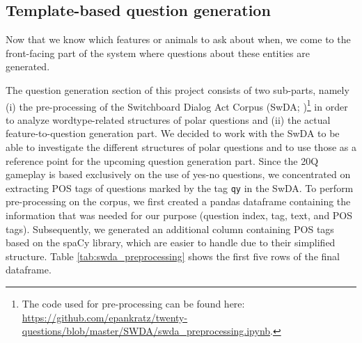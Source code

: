 \documentclass[11pt,a4paper]{article}
\begin{document}
{%
\subsection{Template-based question generation}
\label{subsec:qg}

Now that we know which features or animals to ask about when, we come to the front-facing part of the system where questions about these entities are generated.


The question generation section of this project consists of two sub-parts, namely (i) the pre-processing of the Switchboard Dialog Act Corpus (SwDA; \citealt{JurafskyEa1997,ShribergEa1998,StolckeEa2000})\footnote{The code used for pre-processing can be found here:  \url{https://github.com/epankratz/twenty-questions/blob/master/SWDA/swda_preprocessing.ipynb}.} in order to analyze wordtype-related structures of polar questions and (ii) the actual feature-to-question generation part. 
We decided to work with the SwDA to be able to investigate the different structures of polar questions and to use those as a reference point for the upcoming question generation part. Since the 20Q gameplay is based exclusively on the use of yes-no questions, we concentrated on extracting POS tags of questions marked by the tag \texttt{qy} in the SwDA. To perform pre-processing on the corpus, we first created a pandas dataframe containing the information that was needed for our purpose (question index, tag, text, and POS tags). Subsequently, we generated an additional column containing POS tags based on the spaCy library, which are easier to handle due to their simplified structure. 
Table \ref{tab:swda_preprocessing} shows the first five rows of the final dataframe.

}
\end{document}

